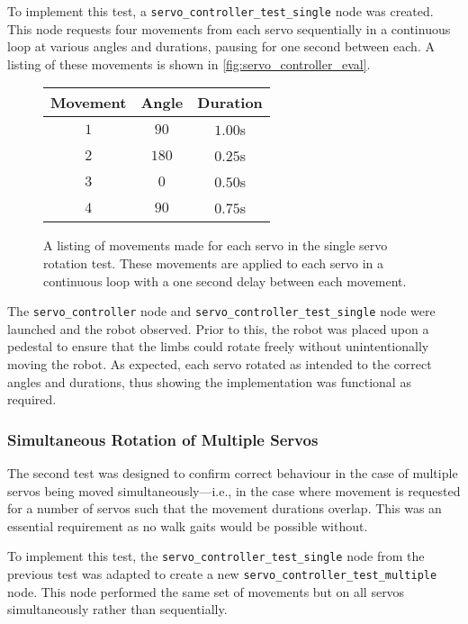 To implement this test, a \texttt{servo\_controller\_test\_single} node was created. This node requests four movements from each servo sequentially in a continuous loop at various angles and durations, pausing for one second between each. A listing of these movements is shown in \autoref{fig:servo_controller_eval}.

\begin{figure}[!h]
	\centering
	\begin{tabular}{ c c c }
		\toprule
		\textbf{Movement} & \textbf{Angle} & \textbf{Duration} \\
		\midrule

		$1$ &
		$90$\textdegree{} &
		$1.00$s \\

		$2$ &
		$180$\textdegree{} &
		$0.25$s \\

		$3$ &
		$0$\textdegree{} &
		$0.50$s \\

		$4$ &
		$90$\textdegree{} &
		$0.75$s \\
		\bottomrule
	\end{tabular}
	\caption{A listing of movements made for each servo in the single servo rotation test. These movements are applied to each servo in a continuous loop with a one second delay between each movement.}
	\label{fig:servo_controller_eval}
\end{figure}

The \texttt{servo\_controller} node and \texttt{servo\_controller\_test\_single} node were launched and the robot observed. Prior to this, the robot was placed upon a pedestal to ensure that the limbs could rotate freely without unintentionally moving the robot. As expected, each servo rotated as intended to the correct angles and durations, thus showing the implementation was functional as required.

\subsubsection{Simultaneous Rotation of Multiple Servos}

The second test was designed to confirm correct behaviour in the case of multiple servos being moved simultaneously---i.e., in the case where movement is requested for a number of servos such that the movement durations overlap. This was an essential requirement as no walk gaits would be possible without.

To implement this test, the \texttt{servo\_controller\_test\_single} node from the previous test was adapted to create a new \texttt{servo\_controller\_test\_multiple} node. This node performed the same set of movements but on all servos simultaneously rather than sequentially.

